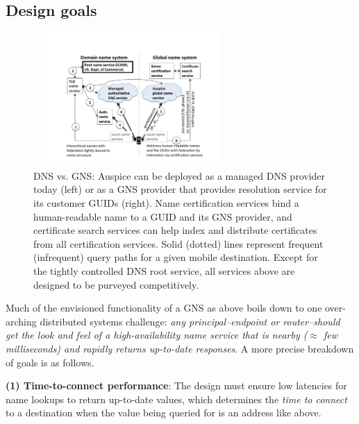\subsection{Design goals}
\label{sec:design_goals}

\begin{figure}[htbp]
	\vsp
	\begin{center}
		\includegraphics[width=3in,height=2in]{figure/DNS-GNS.pdf}
		\figvsp
		\caption{\small{DNS vs. GNS: Auspice can be deployed as a managed DNS provider today (left) or as a GNS provider that provides resolution service for its customer GUIDs (right). Name certification services bind a human-readable name to a GUID and its GNS provider, and certificate search services can help index and distribute certificates from all certification services. Solid (dotted) lines represent frequent (infrequent) query paths for a given mobile destination. Except for the tightly controlled DNS root  service, all services above are designed to be purveyed competitively.} 
		}\label{fig:DNS_GNS}
	\end{center}
	\figvsp
\end{figure}

Much of the envisioned functionality of a GNS as above boils down to one over-arching distributed systems challenge: {\em any principal--endpoint or router--should get the look and feel of a high-availability name service that is nearby ($\approx$ few milliseconds) and rapidly returns up-to-date responses}. A more precise breakdown of goals is as follows.

{\bf (1) Time-to-connect performance}: The design must ensure low latencies  for name lookups to return up-to-date values, which determines the {\em time to connect} to a destination when the value being queried for is an address like above.  %



